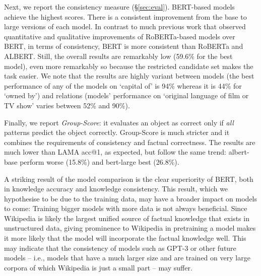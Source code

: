 Next, we report the consistency measure (\S\ref{sec:eval}).
BERT-based models achieve the highest scores. There is a consistent improvement from the {base} to {large} versions of each model.
In contrast to much previous work that observed quantitative and qualitative improvements of RoBERTa-based models over BERT, in terms of consistency, BERT is more consistent than RoBERTa and ALBERT.
Still, the overall results are remarkably low (59.6\% for
the best model), %
even more remarkably so because the restricted candidate set
makes the task easier.
We note that the results are highly variant between models
(the best performance of any of the models on
`capital of' is 94\% whereas it is 44\% for `owned by')
and relations (models' performance on `original language of film or TV show'  varies between 52\% and 90\%).

Finally, we report
\emph{Group-Score}: it evaluates an object as correct only
if \emph{all} patterns predict the object
correctly. Group-Score is much stricter and it combines  the
requirements
of consistency and factual correctness.
The results are much lower than  LAMA acc@1, as expected,
but follow the same trend: albert-base perform worse (15.8\%) and bert-large  best  (26.8\%).






A striking result of the model comparison is
the clear superiority of
BERT, both in knowledge accuracy and knowledge
consistency. This result, which we hypothesise to be due to
the training data, may have a broader impact on models to
come: Training bigger models with more data is not always
beneficial. Since Wikipedia is likely the largest unified source
of factual knowledge that exists in unstructured data,
giving prominence to Wikipedia in pretraining a model makes it more
likely that the model will incorporate the factual knowledge
well. 
This may indicate that  the consistency of models such as GPT-3 \cite{gpt3}
or other future models -- i.e., models that
have a much larger size and
are trained on very large corpora of
which Wikipedia is just a small part -- may suffer.

